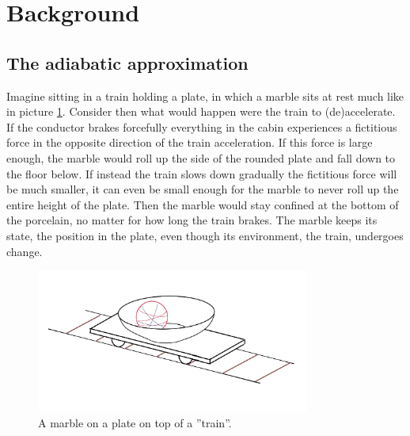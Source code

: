 \documentclass[main.tex]{subfiles}
\begin{document}
\section{Background}
\subsection{The adiabatic approximation}\label{sec:adiab}
Imagine sitting in a train holding a plate, in which a marble sits at rest much like in
picture \ref{fig:marble}. Consider then what would happen were the train to (de)accelerate.
If the conductor brakes forcefully everything in the cabin experiences a fictitious force
in the opposite direction of the train acceleration. If this force is large enough, the marble would roll up the side
of the rounded plate and fall down to the floor below. If instead the train slows down
gradually the fictitious force will be much smaller, it can even be small enough for the
marble to never roll up the entire height of the plate. Then the marble would stay confined
at the bottom of the porcelain, no matter for how long the train brakes. The marble keeps its
state, the position in the plate, even though its environment, the train, undergoes change.

\begin{figure}[h]
        \centering
        \includegraphics[width=0.8\textwidth]{figures/marble_on_train.png}
        \caption{A marble on a plate on top of a ''train''.}
        \label{fig:marble}
\end{figure}
\end{document}
